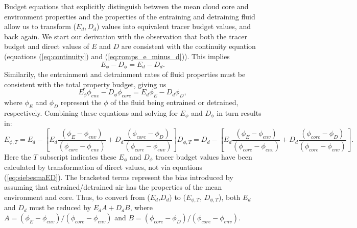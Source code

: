 \documentclass[12pt]{article}
\begin{document}
Budget equations that explicitly distinguish between the mean cloud 
core and environment properties and the properties of the entraining 
and detraining fluid allow us to transform ($E_d, D_d$) values into 
equivalent tracer budget values, and back again.  We start our derivation
with the observation that both the tracer budget and direct values of 
$E$ and $D$ are consistent with the continuity equation (equations 
(\ref{eq:continuity}) and (\ref{eq:romps_e_minus_d})).  This implies  
\begin{equation}
  E_{\phi} - D_{\phi} = E_d - D_d.
\end{equation}
Similarily, the entrainment and detrainment rates of fluid properties 
must be consistent with the total property budget, giving us
\begin{equation}
  E_{\phi} \phi_{env} - D_{\phi} \phi_{core} = E_d \phi_E - D_d \phi_D,
\end{equation}
where $\phi_E$ and $\phi_D$ represent the $\phi$ of the fluid being 
entrained or detrained, respectively. Combining these equations and 
solving for $E_{\phi}$ and $D_{\phi}$ in turn results in:
\begin{subequations}
  \label{eq:correctedED}
\begin{equation}
  \label{eq:corrected_entrainment}
    E_{\phi,T} = E_d 
             - \left[E_d\frac{(\phi_E - \phi_{env})}
                             {(\phi_{core} - \phi_{env})}
                   + D_d\frac{(\phi_{core} - \phi_D)}
                             {(\phi_{core} - \phi_{env})}\right]
\end{equation}
\begin{equation}
  \label{eq:corrected_detrainment}
    D_{\phi,T} = D_d
             - \left[E_d\frac{(\phi_E - \phi_{env})}
                             {(\phi_{core} - \phi_{env})}
                   + D_d\frac{(\phi_{core} - \phi_D)}
                             {(\phi_{core} - \phi_{env})}\right].
\end{equation}
\end{subequations}
Here the $T$ subscript indicates these $E_{\phi}$ and $D_{\phi}$ 
tracer budget values have been calculated by transformation of direct 
values, not via equations (\ref{eq:siebesmaED}).  The bracketed terms 
represent the bias introduced by assuming that entrained/detrained air 
has the properties of the mean environment and core.  Thus, to convert 
from ($E_d$,$D_d$) to ($E_{\phi,T}$, $D_{\phi,T}$), both $E_d$ and $D_d$ 
must be reduced by $E_d A + D_d B$, where 
$A = (\phi_E - \phi_{env})/(\phi_{core} - \phi_{env})$ and 
$B = (\phi_{core} - \phi_D)/(\phi_{core} - \phi_{env})$.  
\end{document}
